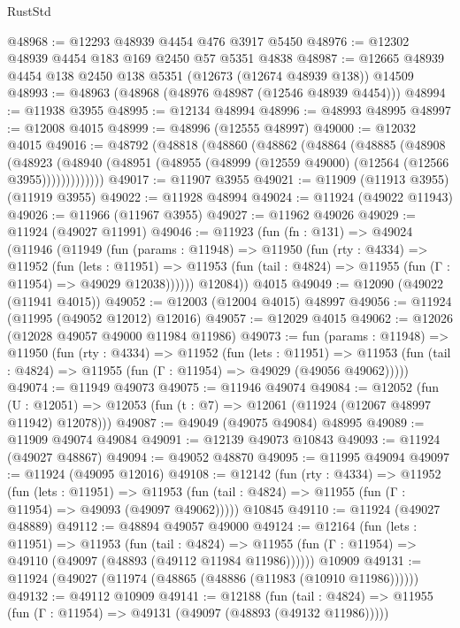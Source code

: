 \begin{lexlean}{RustStd}
\begin{coremodule}
{\begin{coremodule}
{{{{{{{{{{{{{{{{{{{{{{{{{{{{{{{{{{{{{{{{{{{{{{{{{{{{{{{{{{{{{{{{{{{{{{{{{{{{{{{{@48968 := @12293 @48939 @4454 @476 @3917 @5450
@48976 := @12302 @48939 @4454 @183 @169 @2450 @57 @5351 @4838
@48987 := @12665 @48939 @4454 @138 @2450 @138 @5351 (@12673 (@12674 @48939 @138)) @14509
@48993 := @48963 (@48968 (@48976 @48987 (@12546 @48939 @4454)))
@48994 := @11938 @3955
@48995 := @12134 @48994
@48996 := @48993 @48995
@48997 := @12008 @4015
@48999 := @48996 (@12555 @48997)
@49000 := @12032 @4015
@49016 := @48792
    (@48818
      (@48860
        (@48862
          (@48864
            (@48885
              (@48908
                (@48923
                  (@48940 (@48951 (@48955 (@48999 (@12559 @49000) (@12564 (@12566 @3955)))))))))))))
@49017 := @11907 @3955
@49021 := @11909 (@11913 @3955) (@11919 @3955)
@49022 := @11928 @48994
@49024 := @11924 (@49022 @11943)
@49026 := @11966 (@11967 @3955)
@49027 := @11962 @49026
@49029 := @11924 (@49027 @11991)
@49046 := @11923
    (fun (fn : @131) =>
    @49024
      (@11946
        (@11949
          (fun (params : @11948) =>
          @11950
            (fun (rty : @4334) =>
            @11952
              (fun (lets : @11951) =>
              @11953 (fun (tail : @4824) => @11955 (fun (Γ : @11954) => @49029 @12038))))))
        @12084))
    @4015
@49049 := @12090 (@49022 (@11941 @4015))
@49052 := @12003 (@12004 @4015) @48997
@49056 := @11924 (@11995 (@49052 @12012) @12016)
@49057 := @12029 @4015
@49062 := @12026 (@12028 @49057 @49000 @11984 @11986)
@49073 := fun (params : @11948) =>
  @11950
    (fun (rty : @4334) =>
    @11952
      (fun (lets : @11951) =>
      @11953 (fun (tail : @4824) => @11955 (fun (Γ : @11954) => @49029 (@49056 @49062)))))
@49074 := @11949 @49073
@49075 := @11946 @49074
@49084 := @12052
    (fun (U : @12051) => @12053 (fun (t : @7) => @12061 (@11924 (@12067 @48997 @11942) @12078)))
@49087 := @49049 (@49075 @49084) @48995
@49089 := @11909 @49074 @49084
@49091 := @12139 @49073 @10843
@49093 := @11924 (@49027 @48867)
@49094 := @49052 @48870
@49095 := @11995 @49094
@49097 := @11924 (@49095 @12016)
@49108 := @12142
    (fun (rty : @4334) =>
    @11952
      (fun (lets : @11951) =>
      @11953 (fun (tail : @4824) => @11955 (fun (Γ : @11954) => @49093 (@49097 @49062)))))
    @10845
@49110 := @11924 (@49027 @48889)
@49112 := @48894 @49057 @49000
@49124 := @12164
    (fun (lets : @11951) =>
    @11953
      (fun (tail : @4824) =>
      @11955 (fun (Γ : @11954) => @49110 (@49097 (@48893 (@49112 @11984 @11986))))))
    @10909
@49131 := @11924 (@49027 (@11974 (@48865 (@48886 (@11983 (@10910 @11986))))))
@49132 := @49112 @10909
@49141 := @12188
    (fun (tail : @4824) => @11955 (fun (Γ : @11954) => @49131 (@49097 (@48893 (@49132 @11986)))))
}}}}}}}}}}}}}}}}}}}}}}}}}}}}}}}}}}}}}}}}}}}}}}}}}}}}}}}}}}}}}}}}}}}}}}}}}}}}}}}}
\end{coremodule}}
\end{coremodule}
\end{lexlean}
